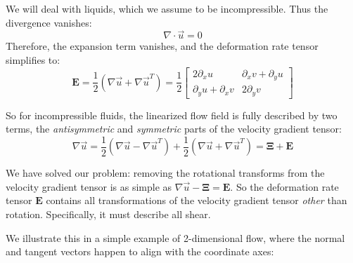 \documentclass[a4paper]{report}
\begin{document}
We will deal with liquids, which we assume to be incompressible.  Thus the divergence vanishes:
\begin{equation}
\nabla \cdot \vec{u} = 0
\end{equation}
Therefore, the expansion term vanishes, and the deformation rate tensor simplifies to:
\begin{equation}
\mathbf{E} = \frac{1}{2}(\nabla \vec{u} + \nabla \vec{u}^T) = 
\frac{1}{2}
\begin{bmatrix}
2 \partial_x u   & \partial_x v + \partial_y u  \\
\partial_y u + \partial_x v  &  2 \partial_y v
\end{bmatrix}
\end{equation}

So for incompressible fluids, the linearized flow field is fully described by two terms, the \emph{antisymmetric} and \emph{symmetric} parts of the velocity gradient tensor:
\begin{equation}
\nabla \vec{u} =
\frac{1}{2}(\nabla \vec{u} - \nabla \vec{u}^T) +
\frac{1}{2}(\nabla \vec{u} + \nabla \vec{u}^T) 
 = \mathbf{\Xi} + \mathbf{E}
\end{equation}

We have solved our problem: removing the rotational transforms from the velocity gradient tensor is as simple as $\nabla \vec{u} - \mathbf{\Xi} = \mathbf{E}$.  So the deformation rate tensor $\mathbf{E}$ contains all transformations of the velocity gradient tensor \emph{other} than rotation.  Specifically, it must describe all shear.

We illustrate this in a simple example of 2-dimensional flow, where the normal and tangent vectors happen to align with the coordinate axes:

\begin{center}
\end{center}
\end{document}
